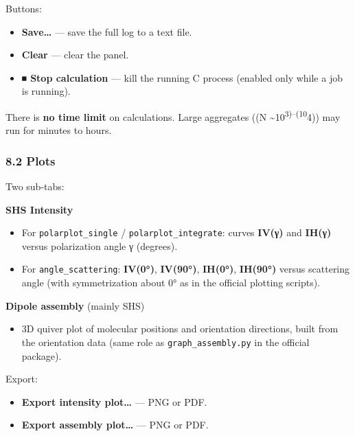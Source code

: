 Buttons:

\begin{itemize}
\tightlist
\item
  \textbf{Save\ldots{}} --- save the full log to a text file.\\
\item
  \textbf{Clear} --- clear the panel.\\
\item
  \textbf{⏹ Stop calculation} --- kill the running C process (enabled
  only while a job is running).
\end{itemize}

There is \textbf{no time limit} on calculations. Large aggregates ((N
\sim 10\textsuperscript{3)--(10}4)) may run for minutes to hours.

\hypertarget{plots}{%
\subsubsection{8.2 Plots}\label{plots}}

Two sub-tabs:

\textbf{SHS Intensity}

\begin{itemize}
\tightlist
\item
  For \texttt{polarplot\_single} / \texttt{polarplot\_integrate}: curves
  \textbf{IV(γ)} and \textbf{IH(γ)} versus polarization angle γ
  (degrees).\\
\item
  For \texttt{angle\_scattering}: \textbf{IV(0°)}, \textbf{IV(90°)},
  \textbf{IH(0°)}, \textbf{IH(90°)} versus scattering angle (with
  symmetrization about 0° as in the official plotting scripts).
\end{itemize}

\textbf{Dipole assembly} (mainly SHS)

\begin{itemize}
\tightlist
\item
  3D quiver plot of molecular positions and orientation directions,
  built from the orientation data (same role as
  \texttt{graph\_assembly.py} in the official package).
\end{itemize}

Export:

\begin{itemize}
\tightlist
\item
  \textbf{Export intensity plot\ldots{}} --- PNG or PDF.\\
\item
  \textbf{Export assembly plot\ldots{}} --- PNG or PDF.
\end{itemize}

